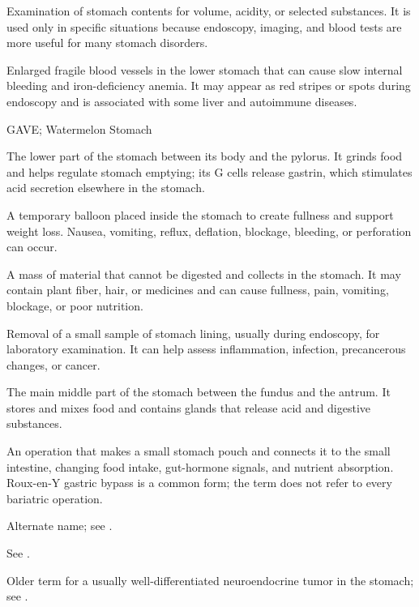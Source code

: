  Examination of stomach contents for volume, acidity, or selected substances. It is used only in specific situations because endoscopy, imaging, and blood tests are more useful for many stomach disorders.

 Enlarged fragile blood vessels in the lower stomach that can cause slow internal bleeding and iron-deficiency anemia. It may appear as red stripes or spots during endoscopy and is associated with some liver and autoimmune diseases.

\synonyms
GAVE; Watermelon Stomach

 The lower part of the stomach between its body and the pylorus. It grinds food and helps regulate stomach emptying; its G cells release gastrin, which stimulates acid secretion elsewhere in the stomach.

 A temporary balloon placed inside the stomach to create fullness and support weight loss. Nausea, vomiting, reflux, deflation, blockage, bleeding, or perforation can occur.

 A mass of material that cannot be digested and collects in the stomach. It may contain plant fiber, hair, or medicines and can cause fullness, pain, vomiting, blockage, or poor nutrition.

 Removal of a small sample of stomach lining, usually during endoscopy, for laboratory examination. It can help assess inflammation, infection, precancerous changes, or cancer.

 The main middle part of the stomach between the fundus and the antrum. It stores and mixes food and contains glands that release acid and digestive substances.

 An operation that makes a small stomach pouch and connects it to the small intestine, changing food intake, gut-hormone signals, and nutrient absorption. Roux-en-Y gastric bypass is a common form; the term does not refer to every bariatric operation.

 Alternate name; see .

 See .

 Older term for a usually well-differentiated neuroendocrine tumor in the stomach; see .

